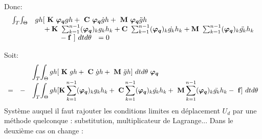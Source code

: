 \documentclass[12pt,a4paper]{report}
\begin{document}
\noindent
Donc:
\begin{equation}
\begin{array}{r l}
	\int_T \! \int_\Theta &		
		gh [~\mathbf{K}~ \boldsymbol{\varphi_q}gh
						+ ~\mathbf{C}~ \boldsymbol{\varphi_q} \dot{g}h 
						+ ~\mathbf{M}~ \boldsymbol{\varphi_q} \ddot{g}h
	\\
	  &
		\phantom{gh
			}+ \mathbf{K}~ \sum_{k=1}^{n-1} (\boldsymbol{\varphi_q})_k       g_k  h_k 
			+  \mathbf{C}~ \sum_{k=1}^{n-1} (\boldsymbol{\varphi_q})_k  \dot{g_k} h_k 
			+  \mathbf{M}~ \sum_{k=1}^{n-1} (\boldsymbol{\varphi_q})_k \ddot{g_k} h_k
	\\
	  &
		\phantom{\boldsymbol{\varphi_q}^{*T}gh} -\mathbf{f}~] ~dt d\theta ~~= 0
\end{array}
\end{equation}

\noindent
Soit:
\begin{equation}
\begin{array}{r r l}
	&& \displaystyle
		\int_T \! \int_\Theta
			gh [  ~\mathbf{K}~ gh
				+ ~\mathbf{C}~ \dot{g}h 
				+ ~\mathbf{M}~ \ddot{g}h
				] ~dt d\theta 
	~ \boldsymbol{\varphi_q}
	\\
	= &-& \displaystyle
		\int_T \! \int_\Theta		
			gh [  \mathbf{K} \sum_{k=1}^{n-1} (\boldsymbol{\varphi_q})_k       g_k  h_k 
				+ ~\mathbf{C} \sum_{k=1}^{n-1} (\boldsymbol{\varphi_q})_k  \dot{g_k} h_k 
				+ ~\mathbf{M} \sum_{k=1}^{n-1} (\boldsymbol{\varphi_q})_k \ddot{g_k} h_k
				- ~\mathbf{f}] ~dt d\theta				
\end{array}
\end{equation}
Système auquel il faut rajouter les conditions limites en déplacement $U_d$ par une méthode quelconque : substitution, multiplicateur de Lagrange... Dans le deuxième cas on change :
\end{document}
